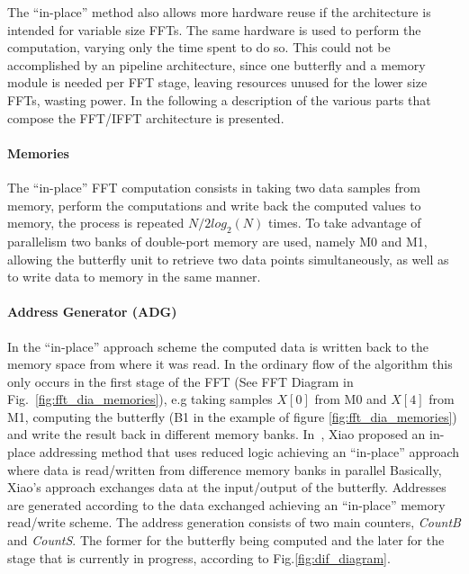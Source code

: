 The  ``in-place'' method also allows more hardware reuse if the architecture is intended for variable size FFTs. The same hardware is used to perform the computation, varying only the time spent to do so. This could not be accomplished by an pipeline architecture, since one butterfly and a memory module is needed per FFT stage, leaving resources unused for the lower size FFTs, wasting power. In the following a description of the various parts that compose the FFT/IFFT architecture is presented. 


\paragraph{Memories}

The ``in-place'' FFT computation consists in taking two data samples from memory, perform the computations
and write back the computed values to memory, the process is repeated $N/2log_{2}(N)$ times. To take advantage of parallelism two banks of double-port memory are used, namely M0 and M1, allowing the butterfly unit to retrieve two data points simultaneously, as well as to write data to memory in the same manner. 

\paragraph{Address Generator (ADG)}
\label{sec:address_generator}


In the ``in-place'' approach scheme the computed data is written back to the memory space from where it was read. In the ordinary flow of the algorithm this only occurs in the first stage of the FFT (See FFT Diagram in Fig.~\ref{fig:fft_dia_memories}), e.g  taking samples $X[0]$ from M0 and $X[4]$ from M1, computing the butterfly (B1 in the example of figure \ref{fig:fft_dia_memories}) and write the result back in different memory banks. In~\cite{xiao_2007}, Xiao proposed an in-place addressing method that uses 
reduced logic achieving an ``in-place'' approach where data is read/written from difference memory banks in parallel Basically, Xiao's approach exchanges data at the input/output of the butterfly. Addresses are generated according to the data exchanged achieving an ``in-place'' memory read/write scheme.   
The address generation consists of two main counters, 
\textit{CountB} and \textit{CountS}. The former for the butterfly being 
computed and the later for the stage that is currently in progress, according to Fig.\ref{fig:dif_diagram}.

